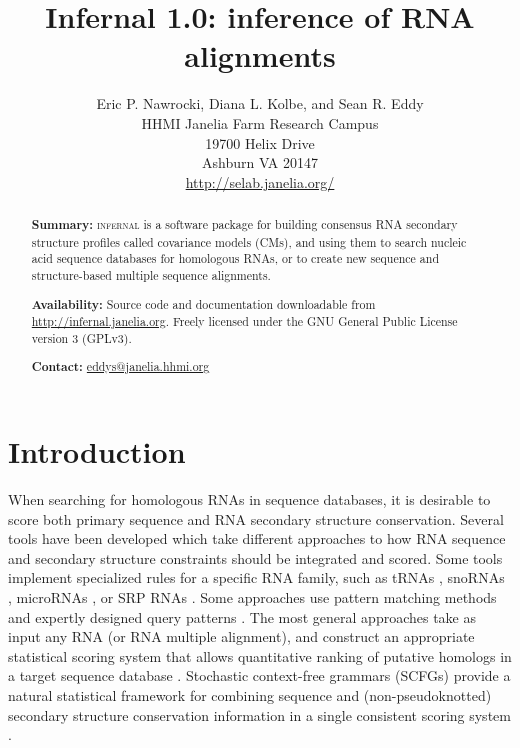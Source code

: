 \documentclass[11pt]{article}
\begin{document}
\title{Infernal 1.0: inference of RNA alignments}
\author{Eric P. Nawrocki, Diana L. Kolbe, and Sean R. Eddy\\
HHMI Janelia Farm Research Campus\\
19700 Helix Drive\\
Ashburn VA 20147\\
\url{http://selab.janelia.org/}\\
}
\maketitle



\begin{abstract}

\textbf{Summary:} \textsc{infernal} is a software package for building
consensus RNA secondary structure profiles called covariance models
(CMs), and using them to search nucleic acid sequence databases for
homologous RNAs, or to create new sequence and structure-based
multiple sequence alignments.

\textbf{Availability:} Source code and documentation downloadable from
\url{http://infernal.janelia.org}. Freely licensed under the GNU
General Public License version 3 (GPLv3).

\textbf{Contact:} \url{eddys@janelia.hhmi.org}

\end{abstract}


\section{Introduction}

When searching for homologous RNAs in sequence databases, it is
desirable to score both primary sequence and RNA secondary structure
conservation. Several tools have been developed which take different
approaches to how RNA sequence and secondary structure constraints
should be integrated and scored. Some tools implement specialized
rules for a specific RNA family, such as tRNAs
\citep{LoweEddy97,Laslett04}, snoRNAs \citep{LoweEddy99,Schattner06},
microRNAs \citep{Lai03,Lim03}, or SRP RNAs \citep{Lai03,Lim03}. Some
approaches use pattern matching methods and expertly designed query
patterns \citep{Macke01}. The most general approaches take as input
any RNA (or RNA multiple alignment), and construct an appropriate
statistical scoring system that allows quantitative ranking of
putative homologs in a target sequence database
\citep{Gautheret01,ZhangBafna05}.  Stochastic context-free grammars
(SCFGs) provide a natural statistical framework for combining sequence
and (non-pseudoknotted) secondary structure conservation information
in a single consistent scoring system
\citep{Sakakibara94c,Eddy94,Brown00,Durbin98}.
\end{document}

